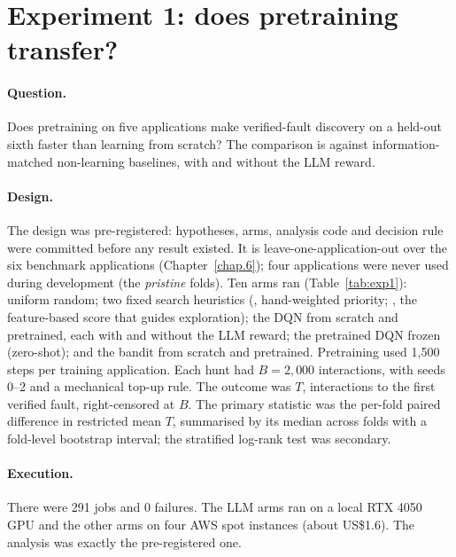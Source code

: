 \section{Experiment 1: does pretraining transfer?}
\label{sec:exp1}

\paragraph{Question.} Does pretraining on five applications make verified-fault discovery on
a held-out sixth faster than learning from scratch? The comparison is against
information-matched non-learning baselines, with and without the LLM reward.

\paragraph{Design.} The design was pre-registered: hypotheses, arms, analysis code and
decision rule were committed before any result existed. It is leave-one-application-out
over the six benchmark applications (Chapter~\ref{chap.6}); four applications were never
used during development (the \emph{pristine} folds). Ten arms ran (Table~\ref{tab:exp1}):
uniform random; two fixed search heuristics (, hand-weighted priority;
, the feature-based score that guides exploration); the DQN from scratch and
pretrained, each with and without the LLM reward; the pretrained DQN frozen (zero-shot); and
the bandit from scratch and pretrained. Pretraining used 1{,}500 steps per training
application. Each hunt had $B = 2{,}000$ interactions, with seeds 0--2 and a mechanical
top-up rule. The outcome was $T$, interactions to the first verified fault, right-censored
at $B$. The primary statistic was the per-fold paired difference in restricted mean $T$,
summarised by its median across folds with a fold-level bootstrap interval; the stratified
log-rank test was secondary.

\paragraph{Execution.} There were 291 jobs and 0 failures. The LLM arms ran on a local RTX 4050 GPU
and the other arms on four AWS spot instances (about US\$1.6). The analysis was exactly the
pre-registered one.

